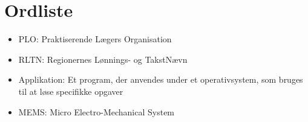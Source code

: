 

\section*{Ordliste}
\begin{itemize}
\item PLO:  Praktiserende Lægers Organisation
\item RLTN: Regionernes Lønnings- og TakstNævn
\item Applikation: Et program, der anvendes under et operativsystem, som bruges til at løse specifikke opgaver
\item MEMS: Micro Electro-Mechanical System
\end{itemize}
